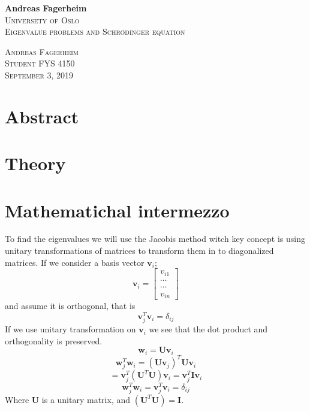 \documentclass{article}
\renewcommand{\headrulewidth}{1pt}
\renewcommand{\footrulewidth}{1pt}
\begin{document}
\begin{titlepage}
	\begin{center}
		\huge{\bfseries Andreas Fagerheim}	\\
		[5cm]
		\textsc{Universety of Oslo}\\
		[1cm]
		\textsc{Eigenvalue problems and Schrödinger equation}\\
		[8cm]
	\end{center}
	\begin{flushright}
	\textsc{Andreas Fagerheim \\
	Student FYS 4150\\
	September 3, 2019}
	\end{flushright}
\end{titlepage}
\section*{Abstract}
\renewcommand{\headrulewidth}{0pt}
\renewcommand{\footrulewidth}{0pt}
\cleardoublepage
\renewcommand{\headrulewidth}{1pt}
\renewcommand{\footrulewidth}{1pt}
\setcounter{page}{1}
\section{Theory}\label{sec:theory}
\section{Mathematichal intermezzo}\label{sec:math}
To find the eigenvalues we will use the Jacobis method witch key concept is using unitary transformations of matrices to transform them in to diagonalized matrices. %
If we consider a basis vector $\mathbf{v}_i$;
$$\mathbf{v}_i = \begin{bmatrix}
					v_{i1} \\
					\cdots\\
					\cdots\\
					v_{in}
\end{bmatrix}
$$
and  assume it is orthogonal, that is
$$\mathbf{v}_j^T \mathbf{v}_i = \delta_{ij}$$
If we use unitary transformation on $\mathbf{v}_i$ we see that the dot product and orthogonality is preserved. 
$$
\mathbf{w}_i = \mathbf{U}\mathbf{v}_i
$$
$$
\mathbf{w}_j^T\mathbf{w}_i = (\mathbf{U}\mathbf{v}_j)^T \mathbf{U}\mathbf{v}_i
$$$$
= \mathbf{v}_j^T(\mathbf{U}^T \mathbf{U})\mathbf{v}_i = \mathbf{v}_j^T\mathbf{I}\mathbf{v}_i 
$$
$$
\mathbf{w}_j^T\mathbf{w}_i = \mathbf{v}_j^T\mathbf{v}_i = \delta_{ij}
$$
Where $\mathbf{U}$ is a unitary matrix, and $(\mathbf{U}^T \mathbf{U}) =\mathbf{I} $.
\end{document}

